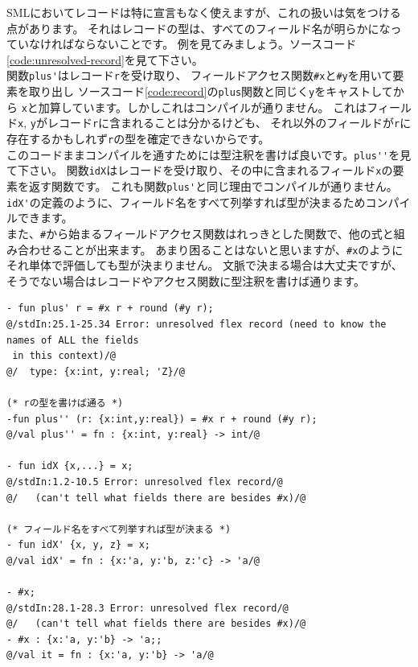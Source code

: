\documentclass[11pt,a4paper]{article}
\begin{document}
SMLにおいてレコードは特に宣言もなく使えますが、これの扱いは気をつける点があります。
それはレコードの型は、すべてのフィールド名が明らかになっていなければならないことです。
例を見てみましょう。ソースコード\ref{code:unresolved-record}を見て下さい。\\
関数\lstinline{plus'}はレコード\lstinline{r}を受け取り、
フィールドアクセス関数\lstinline{#x}と\lstinline{#y}を用いて要素を取り出し
ソースコード\ref{code:record}の\lstinline{plus}関数と同じく\lstinline{y}をキャストしてから
\lstinline{x}と加算しています。しかしこれはコンパイルが通りません。
これはフィールド\lstinline{x}, \lstinline{y}がレコード\lstinline{r}に含まれることは分かるけども、
それ以外のフィールドが\lstinline{r}に存在するかもしれず\lstinline{r}の型を確定できないからです。\\
このコードままコンパイルを通すためには型注釈を書けば良いです。\lstinline{plus''}を見て下さい。
関数\lstinline{idX}はレコードを受け取り、その中に含まれるフィールド\lstinline{x}の要素を返す関数です。
これも関数\lstinline{plus'}と同じ理由でコンパイルが通りません。
\lstinline{idX'}の定義のように、フィールド名をすべて列挙すれば型が決まるためコンパイルできます。\\
また、\lstinline{#}から始まるフィールドアクセス関数はれっきとした関数で、他の式と組み合わせることが出来ます。
あまり困ることはないと思いますが、\lstinline{#x}のようにそれ単体で評価しても型が決まりません。
文脈で決まる場合は大丈夫ですが、そうでない場合はレコードやアクセス関数に型注釈を書けば通ります。

\begin{lstlisting}[caption=フィールド名が解決出来ない例,label=code:unresolved-record]
- fun plus' r = #x r + round (#y r);
@/stdIn:25.1-25.34 Error: unresolved flex record (need to know the names of ALL the fields
 in this context)/@
@/  type: {x:int, y:real; 'Z}/@

(* rの型を書けば通る *)
-fun plus'' (r: {x:int,y:real}) = #x r + round (#y r);
@/val plus'' = fn : {x:int, y:real} -> int/@

- fun idX {x,...} = x;
@/stdIn:1.2-10.5 Error: unresolved flex record/@
@/   (can't tell what fields there are besides #x)/@

(* フィールド名をすべて列挙すれば型が決まる *)
- fun idX' {x, y, z} = x;
@/val idX' = fn : {x:'a, y:'b, z:'c} -> 'a/@

- #x;
@/stdIn:28.1-28.3 Error: unresolved flex record/@
@/   (can't tell what fields there are besides #x)/@
- #x : {x:'a, y:'b} -> 'a;;
@/val it = fn : {x:'a, y:'b} -> 'a/@
\end{lstlisting}
\end{document}

